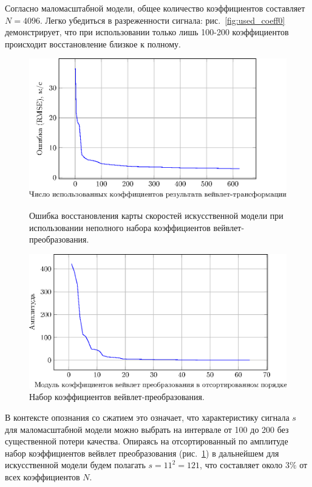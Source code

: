 \documentclass[14pt]{matmex-diploma}
\begin{document}
Согласно маломасштабной модели, общее количество коэффициентов составляет $N = 4096$.  Легко убедиться в разреженности сигнала: рис.~\ref{fig:used_coeff0} демонстрирует, что при использовании только лишь 100-200 коэффициентов происходит восстановление близкое к полному. \\

\begin{figure}[tbp]
  \centering
  \begin{minipage}[b]{0.8\textwidth}
    \includegraphics[width=\textwidth]{pics_eps/rmse_coef_in_use_reconstr.eps}
    \caption{\small Ошибка восстановления карты скоростей искусственной модели при использовании неполного набора коэффициентов вейвлет-преобразования.}
    \label{fig:used_coeff0}
  \end{minipage}
  \hfill
  \begin{minipage}[b]{0.8\textwidth}
    \includegraphics[width=\textwidth]{pics_eps/line_coefs_sparse_reconstr.eps}
    \caption{\small Набор коэффициентов вейвлет-преобразования.}
    \label{fig:used_coeff}
  \end{minipage}
\end{figure}

В контексте опознания со сжатием это означает, что характеристику сигнала $s$ для маломасштабной модели можно выбрать на интервале от 100 до 200 без существенной потери качества. Опираясь на отсортированный по амплитуде набор коэффициентов вейвлет преобразования (рис.~\ref{fig:used_coeff}) в дальнейшем для искусственной модели будем полагать $s=11^2 = 121 $, что составляет около $3\%$ от всех коэффициентов $N$.\\
\end{document}
